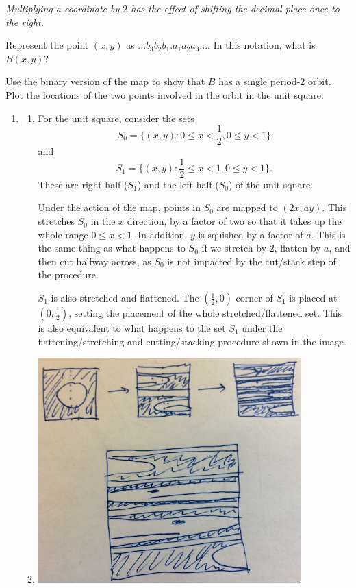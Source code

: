 \documentclass[12pt,letterpaper,noanswers]{exam}
\begin{document}
\begin{questions}
\begin{parts}
\textit{Multiplying a coordinate by $2$ has the effect of shifting the decimal place once to the right.}
\item Represent the point $(x,y)$ as $... b_3 b_2 b_1 . a_1 a_2 a_3 ...$.  In this notation, what is $B(x,y)$?
\item Use the binary version of the map to show that $B$ has a single period-2 orbit.  Plot the locations of the two points involved in the orbit
in the unit square.
\end{parts}

\end{questions}

\eject
\begin{enumerate}




\item
\begin{enumerate}
 \item For the unit square, consider the sets \[S_0=\{(x,y): 0\leq x < \frac{1}{2}, 0\leq y < 1\}\]
 and \[S_1=\{(x,y): \frac{1}{2} \leq x < 1, 0\leq y < 1\}.\]  These are right half ($S_1$) and the left half ($S_0$) of the unit square.
 
 Under the action of the map, points in $S_0$ are mapped to $(2x, ay)$.  This stretches $S_0$ in the $x$ direction, by a factor of two so that it takes up the whole range $0\leq x < 1$.  In addition, $y$ is squished by a factor of $a$.  This is the same thing as what happens to $S_0$
 if we stretch by $2$, flatten by $a$, and then cut halfway across, as $S_0$ is not impacted by the cut/stack step of the procedure.

$S_1$ is also stretched and flattened.  The $(\frac{1}{2},0)$ corner of $S_1$
 is placed at $(0, \frac{1}{2})$, setting the placement of the whole stretched/flattened set.  This is also equivalent to
 what happens to the set $S_1$ under the flattening/stretching and cutting/stacking procedure shown in the image.
 \item 
 
 \includegraphics[width=4in]{img/C22bakers.png}
 

\end{enumerate}
\end{enumerate}
\end{document}
